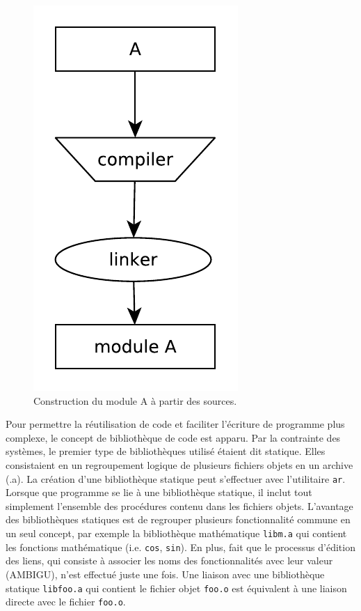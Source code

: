 \begin{figure}[ht]
  \includegraphics[width=0.20\linewidth]{figures/basic_module_compilation.pdf}
  \caption{Construction du module A à partir des sources.}
\end{figure}

%
%

Pour permettre la réutilisation de code et faciliter
l'écriture de programme plus complexe, le concept de bibliothèque de code est
apparu. Par la contrainte des systèmes, le premier type de bibliothèques utilisé
étaient dit statique.  Elles consistaient en un regroupement logique de
plusieurs fichiers objets en un archive (.a). La création d'une bibliothèque
statique peut s'effectuer avec l'utilitaire \verb|ar|. Lorsque que programme se
lie à une bibliothèque statique, il inclut tout simplement l'ensemble des
procédures contenu dans les fichiers objets. L'avantage des bibliothèques
statiques est de regrouper plusieurs fonctionnalité commune en un seul concept,
par exemple la bibliothèque mathématique \verb|libm.a| qui contient les
fonctions mathématique (i.e. \verb|cos|, \verb|sin|).  En plus,  fait que le
processus d'édition des liens, qui consiste à associer les noms des
fonctionnalités avec leur valeur (AMBIGU), n'est effectué juste une fois. Une
liaison avec une bibliothèque statique \verb|libfoo.a| qui contient le fichier
objet \verb|foo.o| est équivalent à une liaison directe avec le fichier
\verb|foo.o|.

